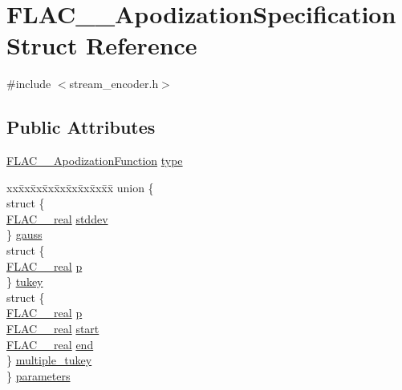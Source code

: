 \hypertarget{struct_f_l_a_c_____apodization_specification}{}\section{F\+L\+A\+C\+\_\+\+\_\+\+Apodization\+Specification Struct Reference}
\label{struct_f_l_a_c_____apodization_specification}


{\ttfamily \#include $<$stream\+\_\+encoder.\+h$>$}

\subsection*{Public Attributes}
\begin{DoxyCompactItemize}
\item 
\hyperlink{src_2lib_f_l_a_c_2include_2protected_2stream__encoder_8h_adc0ccdee5c1fc6fa57c3f430e5cc6374}{F\+L\+A\+C\+\_\+\+\_\+\+Apodization\+Function} \hyperlink{struct_f_l_a_c_____apodization_specification_aa463dc878b0d32d81a7d8ce61e3f3aa0}{type}
\item 
\begin{tabbing}
xx\=xx\=xx\=xx\=xx\=xx\=xx\=xx\=xx\=\kill
union \{\\
\>struct \{\\
\>\>\hyperlink{float_8h_a72409a67c78d2af7d29a9e9362cd49b8}{FLAC\_\_real} \hyperlink{struct_f_l_a_c_____apodization_specification_a6a51fc635757befe6e7542839cac23cb}{stddev}\\
\>\} \hyperlink{struct_f_l_a_c_____apodization_specification_a8e8981d052528559287ad538291cb94f}{gauss}\\
\>struct \{\\
\>\>\hyperlink{float_8h_a72409a67c78d2af7d29a9e9362cd49b8}{FLAC\_\_real} \hyperlink{struct_f_l_a_c_____apodization_specification_ac5001c281e463b2d58202cdf8f9deae8}{p}\\
\>\} \hyperlink{struct_f_l_a_c_____apodization_specification_aeda477a71be430a5b952a1284c061cd4}{tukey}\\
\>struct \{\\
\>\>\hyperlink{float_8h_a72409a67c78d2af7d29a9e9362cd49b8}{FLAC\_\_real} \hyperlink{struct_f_l_a_c_____apodization_specification_ac5001c281e463b2d58202cdf8f9deae8}{p}\\
\>\>\hyperlink{float_8h_a72409a67c78d2af7d29a9e9362cd49b8}{FLAC\_\_real} \hyperlink{struct_f_l_a_c_____apodization_specification_a017f737296d93d12526da14f7ed9371b}{start}\\
\>\>\hyperlink{float_8h_a72409a67c78d2af7d29a9e9362cd49b8}{FLAC\_\_real} \hyperlink{struct_f_l_a_c_____apodization_specification_a4a0d4b7cde5f0a00c7203db222d77a6d}{end}\\
\>\} \hyperlink{struct_f_l_a_c_____apodization_specification_a125d0dfbf48410206c9dbabf352a57dc}{multiple\_tukey}\\
\} \hyperlink{struct_f_l_a_c_____apodization_specification_a6ec9874053eb81a76eb291eeb4575d58}{parameters}\\

\end{tabbing}\end{DoxyCompactItemize}


